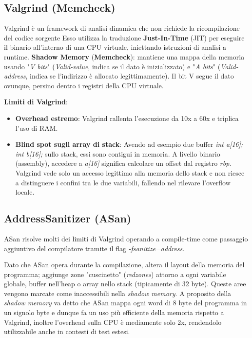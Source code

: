 \subsection{Valgrind (Memcheck)}

Valgrind è un framework di analisi dinamica che non richiede la 
ricompilazione del codice sorgente Esso utilizza la traduzione \textbf{Just-In-Time} 
(JIT) per eseguire il binario all'interno di una CPU virtuale, iniettando 
istruzioni di analisi a runtime. \textbf{Shadow Memory} (\textbf{Memcheck}): mantiene una 
mappa della memoria usando "\textit{V bits}" (\textit{Valid-value}, indica se il dato è 
inizializzato) e "\textit{A bits}" (\textit{Valid-address}, indica se l'indirizzo è allocato 
legittimamente). Il bit V segue il dato ovunque, persino dentro i registri 
della CPU virtuale.

\textbf{Limiti di Valgrind}:
\begin{itemize}
    \item \textbf{Overhead estremo}: Valgrind rallenta l'esecuzione da 10x a 60x e triplica l'uso di RAM.
    \item \textbf{Blind spot sugli array di stack}: Avendo ad esempio due buffer \textit{int a[16]; int b[16];} sullo 
    stack, essi sono contigui in memoria. A livello binario (assembly), accedere 
    a \textit{a[16]} significa calcolare un offset dal registro \textit{rbp}. Valgrind vede 
    solo un accesso legittimo alla memoria dello stack e non riesce a 
    distinguere i confini tra le due variabili, fallendo nel rilevare 
    l'overflow locale.
\end{itemize}

\subsection{AddressSanitizer (ASan)}

ASan risolve molti dei limiti di Valgrind operando a compile-time come 
passaggio aggiuntivo del compilatore tramite il flag \textit{-fsanitize=address}.

Dato che ASan opera durante la compilazione, altera il layout della memoria 
del programma; aggiunge zone "cuscinetto" (\textit{redzones}) attorno a ogni variabile 
globale, buffer nell'heap o array nello stack (tipicamente di 32 byte). 
Queste aree vengono marcate come inaccessibili nella \textit{shadow memory}. A 
proposito della \textit{shadow memory} va detto che ASan mappa ogni word 
di 8 byte del programma in un signolo byte e dunque fa un uso più efficiente 
della memoria rispetto a Valgrind, inoltre l'overhead sulla CPU è mediamente 
solo 2x, rendendolo utilizzabile anche in contesti di test estesi.

